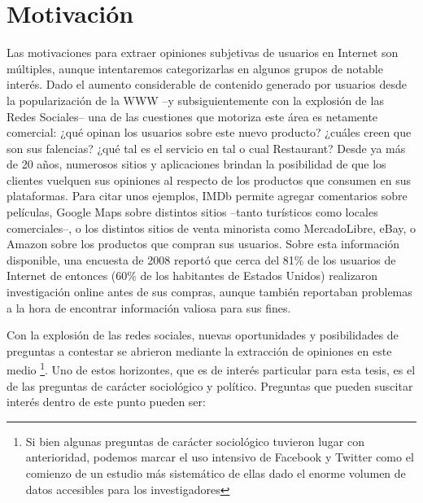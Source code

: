 \section{Motivación}

Las motivaciones para extraer opiniones subjetivas de usuarios en Internet son múltiples, aunque intentaremos categorizarlas en algunos grupos de notable interés. Dado el aumento considerable de contenido generado por usuarios desde la popularización de la WWW  --y subsiguientemente con la explosión de las Redes Sociales-- una de las cuestiones que motoriza este área es netamente comercial: ¿qué opinan los usuarios sobre este nuevo producto? ¿cuáles creen que son sus falencias? ¿qué tal es el servicio en tal o cual Restaurant? Desde ya más de 20 años, numerosos sitios y aplicaciones brindan la posibilidad de que los clientes vuelquen sus opiniones al respecto de los productos que consumen en sus plataformas. Para citar unos ejemplos, IMDb permite agregar comentarios sobre películas, Google Maps sobre distintos sitios --tanto turísticos como locales comerciales--, o los distintos sitios de venta minorista como MercadoLibre, eBay, o Amazon sobre los productos que compran sus usuarios. Sobre esta información disponible, una encuesta de 2008 \cite{horrigan2008online} reportó que cerca del 81\% de los usuarios de Internet de entonces (60\% de los habitantes de Estados Unidos) realizaron investigación online antes de sus compras, aunque también reportaban problemas a la hora de encontrar información valiosa para sus fines.

Con la explosión de las redes sociales, nuevas oportunidades y posibilidades de preguntas a contestar se abrieron mediante la extracción de opiniones en este medio \footnote{Si bien algunas preguntas de carácter sociológico tuvieron lugar con anterioridad, podemos marcar el uso intensivo de Facebook y Twitter como el comienzo de un estudio más sistemático de ellas dado el enorme volumen de datos accesibles para los investigadores}. Uno de estos horizontes, que es de interés particular para esta tesis, es el de las preguntas de carácter sociológico y político. Preguntas que pueden suscitar interés dentro de este punto pueden ser:

